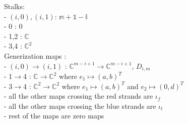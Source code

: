 Stalks:\\
- $(i,0),(i,1)$: $\mathbb{m+1-i}$\\
- 0 : $0$\\
- 1,2 : $\mathbb{C}$\\
- 3,4 : $\mathbb{C}^2$\\

Generization maps :\\

- $(i,0)\rightarrow (i,1)$ : $\mathbb{C}^{m-i+1}\rightarrow\mathbb{C}^{m-i+1}$, $D_{i,m}$\\
- 1$\rightarrow$4 : $\mathbb{C}\rightarrow\mathbb{C}^2$ where $e_1\mapsto (a,b)^T$\\
- 3$\rightarrow$4 : $\mathbb{C}^2 \rightarrow \mathbb{C}^2$ where $e_1\mapsto (a,b)^T$ and $e_2\mapsto (0,d)^T$\\
- all the other maps crossing the red strands are $\iota_f$\\
- all the other maps crossing the blue strands are $\iota_l$\\
- rest of the maps are zero maps\\

